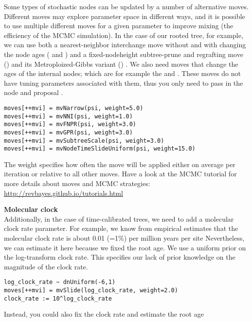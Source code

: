 \begin{framed}
Some types of stochastic nodes can be updated by a number of alternative moves. 
Different moves may explore parameter space in different ways, and it is possible to use multiple different moves for a given parameter to improve mixing (the efficiency of the MCMC simulation). 
In the case of our rooted tree, for example, we can use both a nearest-neighbor interchange move without and with changing the node ages ( and ) and a fixed-nodeheight subtree-prune and regrafting move () and its Metroploized-Gibbs variant () \citep{Hoehna2008,Hoehna2012}. 
We also need moves that change the ages of the internal nodes; which are for example the  and .
These moves do not have tuning parameters associated with them, thus you only need to pass in the  node and proposal . 
{\tt \begin{snugshade*}
\begin{lstlisting}
moves[++mvi] = mvNarrow(psi, weight=5.0)
moves[++mvi] = mvNNI(psi, weight=1.0)
moves[++mvi] = mvFNPR(psi, weight=3.0)
moves[++mvi] = mvGPR(psi, weight=3.0)
moves[++mvi] = mvSubtreeScale(psi, weight=3.0)
moves[++mvi] = mvNodeTimeSlideUniform(psi, weight=15.0)
\end{lstlisting}
\end{snugshade*}}
The weight specifies how often the move will be applied either on average per iteration or relative to all other moves.
Have a look at the MCMC tutorial for more details about moves and MCMC strategies: \href{http://revbayes.github.io/tutorials.html}{http://revbayes.github.io/tutorials.html}

\textbf{Molecular clock}\\

Additionally, in the case of time-calibrated trees, we need to add a molecular clock rate parameter.
For example, we know from empirical estimates that the molecular clock rate is about  0.01 (=1\%) per million years per site
Nevertheless, we can estimate it here because we fixed the root age.
We use a uniform prior on the log-transform clock rate.
This specifies our lack of prior knowledge on the magnitude of the clock rate.
{\tt \begin{snugshade*}
\begin{lstlisting}
log_clock_rate ~ dnUniform(-6,1)
moves[++mvi] = mvSlide(log_clock_rate, weight=2.0)
clock_rate := 10^log_clock_rate
\end{lstlisting}
\end{snugshade*}}

Instead, you could also fix the clock rate and estimate the root age

\end{framed}


